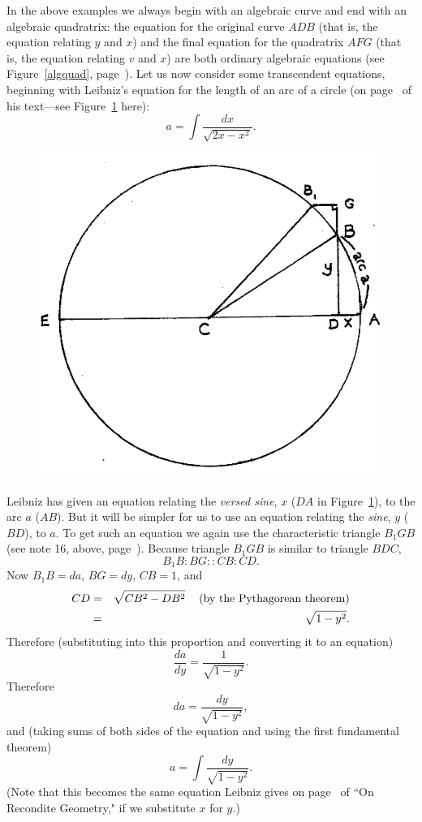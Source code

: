 \documentclass[polutonikogreek,english,twoside,openright]{article}
\newlength{\oldjot}
\begin{document}
\label{begsin} In the above examples we always begin with an algebraic curve and end with an algebraic quadratrix:  the equation for the original curve $ADB$ (that is, the equation relating $y$ and $x$) and the final equation for the quadratrix $AFG$ (that is, the equation relating $v$ and $x$) are both ordinary algebraic equations (see Figure~\ref{algquad}, page~\pageref{algquad}). Let us now consider some transcendent equations, beginning with Leibniz's equation for the length of an arc of a circle (on page~\pageref{lcircarc} of his text---see Figure~\ref{circarc2} here):
$$a =  \int \!\frac{dx}{\sqrt{2x-x^2}}.$$
\begin{figure}[htp]
\begin{center}
\includegraphics[width=.65\textwidth]{fig/Figure42}
\caption{}
\label{circarc2}
\vspace{-10pt}
\end{center}
\end{figure} 

Leibniz has given an equation relating the {\em versed sine}, $x$
($DA$ in Figure~\ref{circarc2}), to the arc $a$ ($AB$).  But it will
be simpler for us to use an equation relating the {\em sine}, $y$
($BD$), to $a$.  To get such an equation we again use the
characteristic triangle $B_1GB$ (see note 16, above,
page~\pageref{crg16}).  Because triangle $B_1GB$ is similar to
triangle $BDC$,
$$B_1B \!:\! BG :: CB \!:\!CD.$$
Now $B_1B = da$, $BG = dy$, $CB = 1$, and 
\setlength{\jot}{1.5ex}
\begin{eqnarray*}
CD & = & \sqrt{CB^2 - DB^2} \mbox{\hspace{2ex} (by the Pythagorean theorem)}\\
& = & \sqrt{1 - y^2}.
\end{eqnarray*}
\setlength{\jot}{\oldjot}
Therefore (substituting into this proportion and converting it to an equation)
$$\frac{da}{dy} = \frac{1}{\sqrt{1-y^2}}.$$
Therefore
$$da = \frac{dy}{\sqrt{1-y^2}},$$
and (taking sums of both sides of the equation and using the first fundamental theorem)
$$a = \int\!\frac{dy}{\sqrt{1-y^2}}.$$
(Note that this becomes the same equation Leibniz gives on page~\pageref{rgcircarc} of ``On Recondite Geometry," if we substitute $x$ for $y$.)
\end{document}
